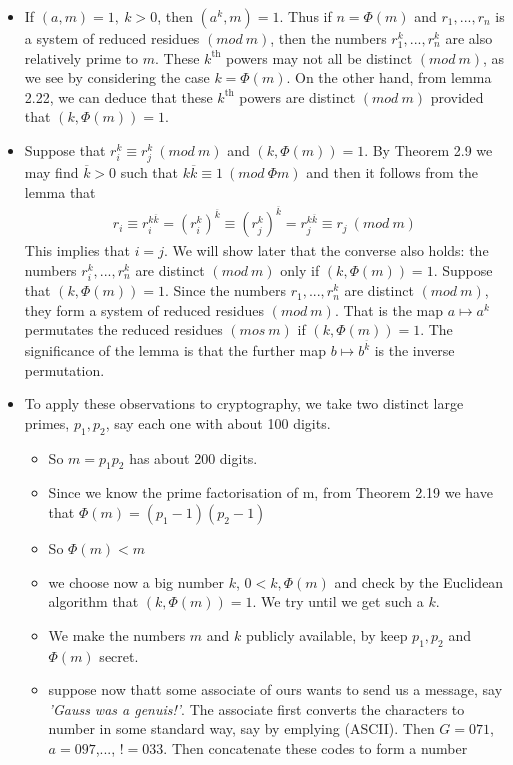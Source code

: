 \documentclass[a4paper]{article}
\begin{document}
\begin{itemize}
    \item If $(a,m)=1,\ k>0$, then $(a^k,m)=1$. Thus if $n=\Phi(m)$ and $r_1,...,r_n$ is a system of reduced residues $(mod\ m)$, then the numbers $r_1^k,...,r_n^k$ are also relatively prime to $m$. These $k^\text{th}$ powers may not all be distinct $(mod\ m)$, as we see by considering the case $k=\Phi(m)$. On the other hand, from lemma 2.22, we can deduce that these $k^\text{th}$ powers are distinct $(mod\ m)$ provided that $(k,\Phi(m))=1$.
    \item Suppose that $r_i^k\equiv r_j^k\ (mod\ m)$ and $(k,\Phi(m))=1$. By Theorem 2.9 we may find $\overline{k}>0$ such that $k\overline{k}\equiv 1\ (mod\ \Phi{m})$ and then it follows from the lemma that
    \begin{align}
        r_i\equiv r_i^{k\overline{k}}=(r_i^k)^{\overline{k}}\equiv (r_j^k)^{\overline{k}}= r_j^{k\overline{k}}\equiv r_j\ (mod\ m)
    \end{align}
    This implies that $i=j$. We will show later that the converse also holds: the numbers $r_i^k,...,r_n^k$ are distinct $(mod\ m)$ only if $(k,\Phi(m))=1$. Suppose that $(k,\Phi(m))=1$. Since the numbers $r_1,...,r_n^k$ are distinct $(mod\ m)$, they form a system of reduced residues $(mod\ m)$. That is the map $a\mapsto a^k$ permutates the reduced residues $(mos\ m)$ if $(k,\Phi(m))=1$. The significance of the lemma is that the further map $b\mapsto b^{\overline{k}}$ is the inverse permutation.
    \item To apply these observations to cryptography, we take two distinct large primes, $p_1, p_2$, say each one with about 100 digits.
    \begin{itemize}
        \item So $m=p_1p_2$ has about 200 digits.
        \item Since we know the prime factorisation of m, from Theorem 2.19 we have that $\Phi(m)=(p_1-1)(p_2-1)$
        \item So $\Phi(m)<m$
        \item we choose now a big number $k$, $0<k,\Phi(m)$ and check by the Euclidean algorithm that $(k,\Phi(m))=1$. We try until we get such a $k$.
        \item We make the numbers $m$ and $k$ publicly available, by keep $p_1,p_2$ and $\Phi(m)$ secret.
        \item suppose now thatt some associate of ours wants to send us a message, say \textit{'Gauss was a genuis!'}. The associate first converts the characters to number in some standard way, say by emplying (ASCII). Then $G=071$, $a=097$,..., $!=033$. Then concatenate these codes to form a number

\end{itemize}
\end{itemize}
\end{document}

